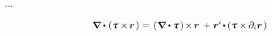 \begin{otherlanguage}{russian}
...

\nopagebreak\vspace{-0.2em}\begin{equation*}
\tikzmark{divergenceOfStressCrossLocationBegin} \hspace{-0.2ex} \boldnabla \dotp \hspace{.1ex} \left( \cauchystress \times \hspace{-0.25ex} \currentlocationvector \hspace{.2ex} \right) \hspace{-0.33ex} \tikzmark{divergenceOfStressCrossLocationEnd}
= \hspace{-0.33ex} \tikzmark{firstTermOfStressCrossLocationDivergenceBegin} \hspace{.1ex} \left( \hspace{.1ex} \boldnabla \dotp \cauchystress \hspace{.2ex} \right) \hspace{-0.25ex} \times \hspace{-0.2ex} \currentlocationvector \hspace{.2ex} \tikzmark{firstTermOfStressCrossLocationDivergenceEnd} \hspace{.15ex}
+ \hspace{.1ex} \currentlocationvector^{i} \hspace{-0.25ex} \dotp \hspace{-0.1ex} \left( \cauchystress \hspace{-0.1ex} \times \hspace{-0.12ex} \partial_i \currentlocationvector \hspace{.24ex} \right)
\end{equation*}
%


\end{otherlanguage}
